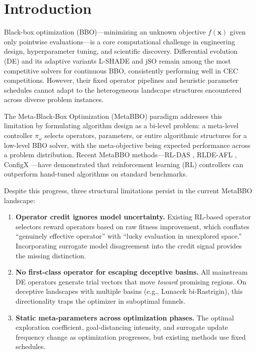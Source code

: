 \documentclass[preprint,12pt,number]{elsarticle}
\begin{document}
\section{Introduction}
\label{sec:intro}

Black-box optimization (BBO)---minimizing an unknown objective $f(\mathbf{x})$ given only pointwise evaluations---is a core computational challenge in engineering design, hyperparameter tuning, and scientific discovery. Differential evolution (DE) \cite{Storn1997} and its adaptive variants L-SHADE \cite{Tanabe2014} and jSO \cite{Brest2017} remain among the most competitive solvers for continuous BBO, consistently performing well in CEC competitions. However, their fixed operator pipelines and heuristic parameter schedules cannot adapt to the heterogeneous landscape structures encountered across diverse problem instances.

The Meta-Black-Box Optimization (MetaBBO) paradigm \cite{Ma2025survey} addresses this limitation by formulating algorithm design as a bi-level problem: a meta-level controller $\pi_\omega$ selects operators, parameters, or entire algorithmic structures for a low-level BBO solver, with the meta-objective being expected performance across a problem distribution. Recent MetaBBO methods---RL-DAS \cite{Guo2024}, RLDE-AFL \cite{Guo2025}, ConfigX \cite{Guo2024configx}---have demonstrated that reinforcement learning (RL) controllers can outperform hand-tuned algorithms on standard benchmarks.

Despite this progress, three structural limitations persist in the current MetaBBO landscape:

\begin{enumerate}
\item \textbf{Operator credit ignores model uncertainty.} Existing RL-based operator selectors reward operators based on raw fitness improvement, which conflates ``genuinely effective operator'' with ``lucky evaluation in unexplored space.'' Incorporating surrogate model disagreement into the credit signal provides the missing distinction.

\item \textbf{No first-class operator for escaping deceptive basins.} All mainstream DE operators generate trial vectors that move \emph{toward} promising regions. On deceptive landscapes with multiple basins (e.g., Lunacek bi-Rastrigin), this directionality traps the optimizer in suboptimal funnels.

\item \textbf{Static meta-parameters across optimization phases.} The optimal exploration coefficient, goal-distancing intensity, and surrogate update frequency change as optimization progresses, but existing methods use fixed schedules.
\end{enumerate}
\end{document}
